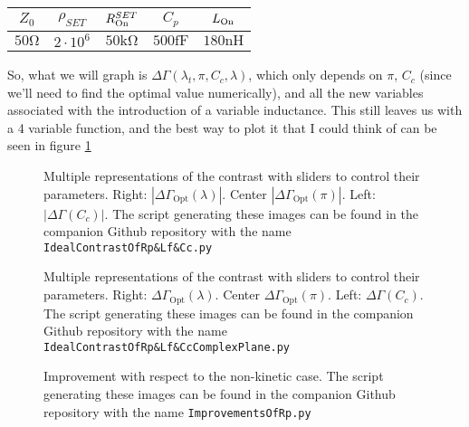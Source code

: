 \documentclass[../main.tex]{subfiles}
\begin{document}
\begin{table}[H]
    \centering
    \begin{tabular}{c|c|c|c|c}
        \(Z_{0}\) & \(\rho_{SET}\) & \(R_{\text{On}}^{SET}\) & \(C_{p}\) & \(L_{\text{On}}\) \\\hline
        \(50\unit{\ohm}\) & \(2\cdot10^{6}\) & \(50\unit{\kilo\ohm}\) & \(500\unit{\femto\farad}\) & \(180\unit{\nano\henry}\)
    \end{tabular}
\end{table}

So, what we will graph is \(\Delta\Gamma(\lambda_{t}, \pi, C_{c}, \lambda)\),
which only depends on \(\pi\), \(C_{c}\) (since we'll need to find the optimal
value numerically), and all the new variables associated with the introduction
of a variable inductance. This still leaves us with a 4 variable function, and
the best way to plot it that I could think of can be seen in figure
\ref{fig:IdealContrast}

\begin{figure}[t]
\centering
  
  \caption{Multiple representations of the contrast with sliders to control
  their parameters. Right: \(|\Delta\Gamma_{\text{Opt}}(\lambda)|\).
  Center \(|\Delta\Gamma_{\text{Opt}}(\pi)|\). Left: \(|\Delta\Gamma(C_{c})|\).
  The script generating these images can be found in the companion Github
  repository with the name \texttt{IdealContrastOfRp\&Lf\&Cc.py}
}
\label{fig:IdealContrast}
\end{figure}

\begin{figure}[t]
\centering
  
  \caption{Multiple representations of the contrast with sliders to control
  their parameters. Right: \(\Delta\Gamma_{\text{Opt}}(\lambda)\).
  Center \(\Delta\Gamma_{\text{Opt}}(\pi)\). Left: \(\Delta\Gamma(C_{c})\).
  The script generating these images can be found in the companion Github
  repository with the name \texttt{IdealContrastOfRp\&Lf\&CcComplexPlane.py}
}
\label{fig:IdealComplexContrast}
\end{figure}

\begin{figure}[t]
\centering
  
  \caption{Improvement with respect to the non-kinetic case. The script generating these
  images can be found in the companion Github repository with the name \texttt{ImprovementsOfRp.py}}
\label{fig:KineticImprovement}
\end{figure}
\end{document}
